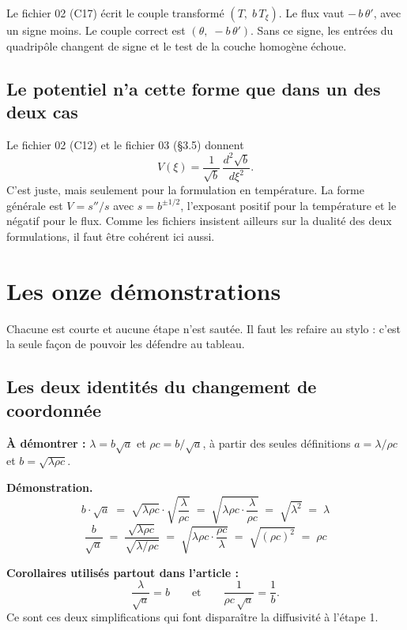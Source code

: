 \documentclass[11pt,a4paper]{article}
\begin{document}
Le fichier 02 (C17) écrit le couple transformé $(T,\; b\,T_\xi)$. Le flux vaut $-\,b\,\theta'$, avec un
signe moins. Le couple correct est $(\theta,\; -b\,\theta')$. Sans ce signe, les entrées du quadripôle
changent de signe et le test de la couche homogène échoue.

\subsection{Le potentiel n'a cette forme que dans un des deux cas}

Le fichier 02 (C12) et le fichier 03 (§3.5) donnent
\[ V(\xi) = \frac{1}{\sqrt{b}}\,\frac{d^{2}\sqrt{b}}{d\xi^{2}} . \]
C'est juste, mais seulement pour la formulation en température. La forme générale est $V = s''/s$ avec
$s = b^{\pm 1/2}$, l'exposant positif pour la température et le négatif pour le flux. Comme les
fichiers insistent ailleurs sur la dualité des deux formulations, il faut être cohérent ici aussi.

\newpage
\section{Les onze démonstrations}

Chacune est courte et aucune étape n'est sautée. Il faut les refaire au stylo : c'est la seule façon
de pouvoir les défendre au tableau.

\subsection{Les deux identités du changement de coordonnée}

\textbf{À démontrer :} $\lambda = b\sqrt{a}$ et $\rho c = b/\sqrt{a}$, à partir des seules définitions
$a = \lambda/\rho c$ et $b = \sqrt{\lambda \rho c}$.

\textbf{Démonstration.}
\[ b\cdot\sqrt{a} \;=\; \sqrt{\lambda\rho c}\cdot\sqrt{\frac{\lambda}{\rho c}}
\;=\; \sqrt{\lambda\rho c \cdot \frac{\lambda}{\rho c}} \;=\; \sqrt{\lambda^{2}} \;=\; \lambda \]
\[ \frac{b}{\sqrt{a}} \;=\; \frac{\sqrt{\lambda\rho c}}{\sqrt{\lambda/\rho c}}
\;=\; \sqrt{\lambda\rho c \cdot \frac{\rho c}{\lambda}} \;=\; \sqrt{(\rho c)^{2}} \;=\; \rho c \]

\textbf{Corollaires utilisés partout dans l'article :}
\[ \frac{\lambda}{\sqrt{a}} = b
\qquad\text{et}\qquad
\frac{1}{\rho c\,\sqrt{a}} = \frac{1}{b} . \]
Ce sont ces deux simplifications qui font disparaître la diffusivité à l'étape 1.
\end{document}
